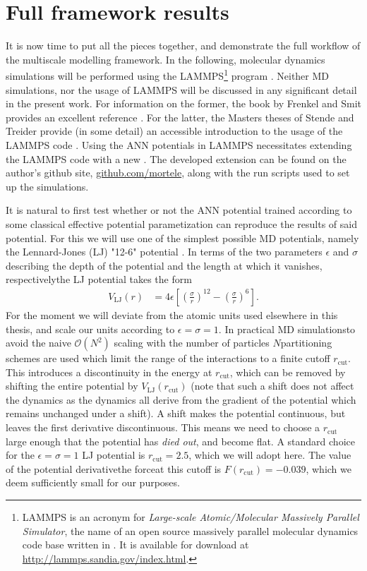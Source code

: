 \documentclass[../../master.tex]{subfiles}
\begin{document}
\chapter{Full framework results}
It is now time to put all the pieces together, and demonstrate the full workflow of the multiscale modelling framework. In the following, molecular dynamics simulations will be performed using the LAMMPS\footnote{LAMMPS is an acronym for \emph{Large-scale Atomic/Molecular Massively Parallel Simulator}, the name of an open source massively parallel molecular dynamics code base written in \CC{}. It is available for download at \url{http://lammps.sandia.gov/index.html}.} program \cite{plimpton1995fast}. Neither MD simulations, nor the usage of LAMMPS will be discussed in any significant detail in the present work. For information on the former, the book by Frenkel and Smit provides an excellent reference \cite{frenkel}. For the latter, the Masters theses of Stende and Treider provide (in some detail) an accessible introduction to the usage of the LAMMPS code \cite{stende,treider}. Using the ANN potentials in LAMMPS necessitates extending the LAMMPS code with a new . The developed extension can be found on the author's github site, \url{github.com/mortele}, along with the run scripts used to set up the simulations.

\phantom{-}

\newcommand{\rc}{r_\text{cut}}
It is natural to first test whether or not the ANN potential trained according to some classical effective potential parametization can reproduce the results of said potential. For this we will use one of the simplest possible MD potentials, namely the Lennard-Jones (LJ) "12-6" potential \cite{Jones463}. In terms of the two parameters $\epsilon$ and $\sigma$\textemdash describing the depth of the potential and the length at which it vanishes, respectively\textemdash the LJ potential takes the form
\begin{align}
V_\text{LJ}(r) &= 4\epsilon \left[\left(\frac{\sigma}{r}\right)^{12} - \left(\frac{\sigma}{r}\right)^6\right]. 
\end{align}
For the moment we will deviate from the atomic units used elsewhere in this thesis, and scale our units according to $\epsilon=\sigma=1$. In practical MD simulations\textemdash  to avoid the naive $\mathcal{O}(N^2)$ scaling with the number of particles $N$\textemdash partitioning schemes are used which limit the range of the interactions to a finite cutoff $r_\text{cut}$. This introduces a discontinuity in the energy at $\rc$, which can be removed by shifting the entire potential by $V_\text{LJ}(\rc)$ (note that such a shift does not affect the dynamics as the dynamics all derive from the gradient of the potential which remains unchanged under a shift). A shift makes the potential continuous, but leaves the first derivative discontinuous. This means we need to choose a $\rc$ large enough that the potential has \emph{died out}, and become flat. A standard choice for the $\epsilon=\sigma=1$ LJ potential is $\rc=2.5$, which we will adopt here. The value of the 
potential derivative\textemdash the force\textemdash at this cutoff is $F(\rc)=-0.039$, which we deem sufficiently small for our purposes.
\end{document}
